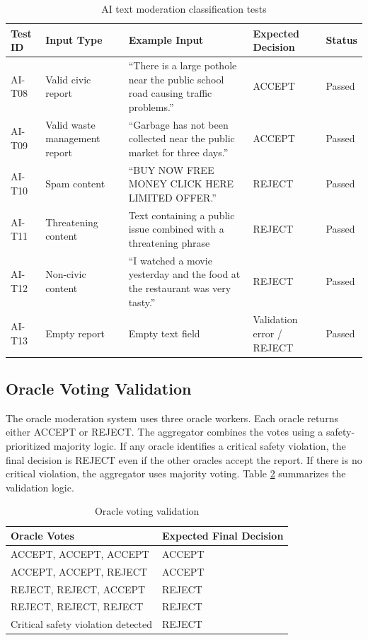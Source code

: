 \begin{table}[H]
\centering
\caption{AI text moderation classification tests}
\begin{tabular}{|p{2cm}|p{3cm}|p{4cm}|p{2cm}|p{2cm}|}
\hline
\textbf{Test ID} & \textbf{Input Type} & \textbf{Example Input} & \textbf{Expected Decision} & \textbf{Status}\\
\hline
AI-T08 & Valid civic report & ``There is a large pothole near the public school road causing traffic problems.'' & ACCEPT & Passed \\
\hline
AI-T09 & Valid waste management report & ``Garbage has not been collected near the public market for three days.'' & ACCEPT & Passed\\
\hline
AI-T10 & Spam content & ``BUY NOW FREE MONEY CLICK HERE LIMITED OFFER.'' & REJECT & Passed\\
\hline
AI-T11 & Threatening content & Text containing a public issue combined with a threatening phrase & REJECT & Passed \\
\hline
AI-T12 & Non-civic content & ``I watched a movie yesterday and the food at the restaurant was very tasty.'' & REJECT & Passed \\
\hline
AI-T13 & Empty report & Empty text field & Validation error / REJECT & Passed \\
\hline
\end{tabular}
\label{tab:ai_classification_tests}
\end{table}

\subsection{Oracle Voting Validation}

The oracle moderation system uses three oracle workers. Each oracle returns either
ACCEPT or REJECT. The aggregator combines the votes using a safety-prioritized
majority logic. If any oracle identifies a critical safety violation, the final decision
is REJECT even if the other oracles accept the report. If there is no critical
violation, the aggregator uses majority voting. Table \ref{tab:oracle_voting_validation} summarizes the validation logic.



\begin{table}[H]
\centering
\caption{Oracle voting validation}
\begin{tabular}{|p{6cm}|p{5cm}|}
\hline
\textbf{Oracle Votes} & \textbf{Expected Final Decision} \\
\hline
ACCEPT, ACCEPT, ACCEPT & ACCEPT \\
\hline
ACCEPT, ACCEPT, REJECT & ACCEPT \\
\hline
REJECT, REJECT, ACCEPT & REJECT \\
\hline
REJECT, REJECT, REJECT & REJECT \\
\hline
Critical safety violation detected & REJECT \\
\hline
\end{tabular}
\label{tab:oracle_voting_validation}
\end{table}

